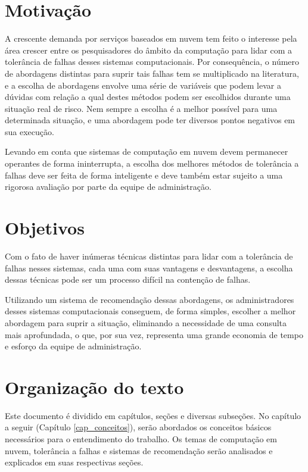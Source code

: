 \documentclass[
	12pt,				%
	openright,			%
	twoside,			%
	a4paper,			%
	english,			%
	french,				%
	spanish,			%
	brazil				%
	]{abntex2}
\begin{document}
\section{Motivação}

A crescente demanda por serviços baseados em nuvem tem feito o interesse pela área crescer entre os pesquisadores do âmbito da computação para lidar com a tolerância de falhas desses sistemas computacionais. Por consequência, o número de abordagens distintas para suprir tais falhas tem se multiplicado na literatura, e a escolha de abordagens envolve uma série de variáveis que podem levar a dúvidas com relação a qual destes métodos podem ser escolhidos durante uma situação real de risco. Nem sempre a escolha é a melhor possível para uma determinada situação, e uma abordagem pode ter diversos pontos negativos em sua execução.

Levando em conta que sistemas de computação em nuvem devem permanecer operantes de forma ininterrupta, a escolha dos melhores métodos de tolerância a falhas deve ser feita de forma inteligente e deve também estar sujeito a uma rigorosa avaliação por parte da equipe de administração.

\section{Objetivos}

Com o fato de haver inúmeras técnicas distintas para lidar com a tolerância de falhas nesses sistemas, cada uma com suas vantagens e desvantagens, a escolha dessas técnicas pode ser um processo difícil na contenção de falhas.

Utilizando um sistema de recomendação dessas abordagens, os administradores desses sistemas computacionais conseguem, de forma simples, escolher a melhor abordagem para suprir a situação, eliminando a necessidade de uma consulta mais aprofundada, o que, por sua vez, representa uma grande economia de tempo e esforço da equipe de administração.

\section{Organização do texto}

Este documento é dividido em capítulos, seções e diversas subseções. No capítulo a seguir (Capítulo \ref{cap_conceitos}), serão abordados os conceitos básicos necessários para o entendimento do trabalho. Os temas de computação em nuvem, tolerância a falhas e sistemas de recomendação serão analisados e explicados em suas respectivas seções.
\end{document}
